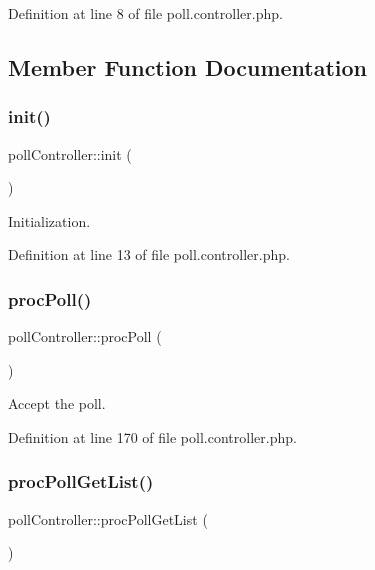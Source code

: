 Definition at line 8 of file poll.\+controller.\+php.



\subsection{Member Function Documentation}
\mbox{\label{classpollController_a963891da278c1adc2400f688270342a2}} 
\subsubsection{\texorpdfstring{init()}{init()}}
{\footnotesize\ttfamily poll\+Controller\+::init (\begin{DoxyParamCaption}{ }\end{DoxyParamCaption})}



Initialization. 



Definition at line 13 of file poll.\+controller.\+php.

\mbox{\label{classpollController_a78770967734dc31fdfe1bba48d7e6196}} 
\subsubsection{\texorpdfstring{proc\+Poll()}{procPoll()}}
{\footnotesize\ttfamily poll\+Controller\+::proc\+Poll (\begin{DoxyParamCaption}{ }\end{DoxyParamCaption})}



Accept the poll. 



Definition at line 170 of file poll.\+controller.\+php.

\mbox{\label{classpollController_a7b10edf49b567e9d239c2e6bf8b12e93}} 
\subsubsection{\texorpdfstring{proc\+Poll\+Get\+List()}{procPollGetList()}}
{\footnotesize\ttfamily poll\+Controller\+::proc\+Poll\+Get\+List (\begin{DoxyParamCaption}{ }\end{DoxyParamCaption})}



